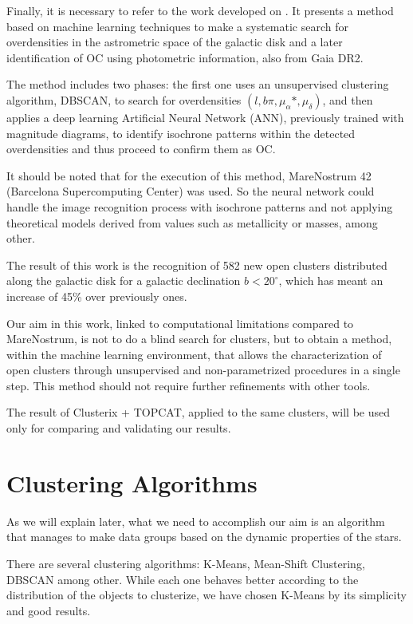 \documentclass[11pt, a4paper, english]{book}
\begin{document}
Finally, it is necessary to refer to the work developed on \cite{castro2020hunting}.
It presents a method based on machine learning techniques to make a systematic search
for overdensities in the astrometric space of the galactic disk
and a later identification of OC using photometric information, also from Gaia DR2.

The method includes two phases: the first one uses an unsupervised clustering algorithm, DBSCAN,
to search for overdensities $(l, b \pi, \mu_{\alpha} *, \mu_{\delta})$,
and then applies a deep learning Artificial Neural Network (ANN),
previously trained with magnitude diagrams,
to identify isochrone patterns within the detected overdensities and thus proceed to confirm them as OC.

It should be noted that for the execution of this method,
MareNostrum 42 (Barcelona Supercomputing Center) was used.
So the neural network could handle the image recognition process with isochrone patterns
and not applying theoretical models derived from values such as metallicity or masses, among other.

The result of this work is the recognition of 582 new open clusters
distributed along the galactic disk for a galactic declination $b < 20^{\circ}$,
which has meant an increase of 45\% over previously ones.

Our aim in this work, linked to computational limitations compared to MareNostrum,
is not to do a blind search for clusters, but to obtain a method,
within the machine learning environment,
that allows the characterization of open clusters through unsupervised and non-parametrized procedures in a single step.
This method should not require further refinements with other tools.

The result of Clusterix + TOPCAT, applied to the same clusters,
will be used only for comparing and validating our results.

\section{Clustering Algorithms}

As we will explain later, what we need to accomplish our aim is an algorithm
that manages to make data groups based on the dynamic properties of the stars.

There are several clustering algorithms: K-Means, Mean-Shift Clustering, DBSCAN \cite{ester1996density} among other.
While each one behaves better according to the distribution of the objects to clusterize,
we have chosen K-Means by its simplicity and good results.
\end{document}
